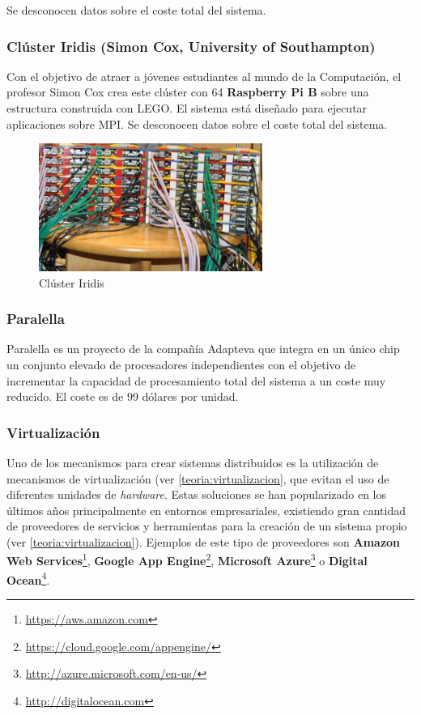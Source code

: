 Se desconocen datos sobre el coste total del sistema.

\subsubsection{Clúster Iridis (Simon Cox, University of Southampton)}

Con el objetivo de atraer a jóvenes estudiantes al mundo de la Computación, el profesor Simon Cox crea este clúster con 64 \textbf{Raspberry Pi B} sobre una estructura construida con LEGO\cite{cox:raspberry}. El sistema está diseñado para ejecutar aplicaciones sobre MPI. Se desconocen datos sobre el coste total del sistema.

\begin{figure}[H]
	\centering
	\includegraphics[width=0.65\textwidth]{Chapters/Chapter1/Figures/iridis-pi.jpg}
	\caption[Iridis]{Clúster Iridis}
	\label{cox:iridis}
\end{figure}

\subsubsection{Paralella}

Paralella es un proyecto de la compañía Adapteva que integra en un único chip un conjunto elevado de procesadores independientes con el objetivo de incrementar la capacidad de procesamiento total del sistema a un coste muy reducido\cite{paralella}. El coste es de 99 dólares por unidad.

\subsubsection{Virtualización}

Uno de los mecanismos para crear sistemas distribuidos es la utilización de mecanismos de virtualización (ver \ref{teoria:virtualizacion}, que evitan el uso de diferentes unidades de \textit{hardware}. Estas soluciones se han popularizado en los últimos años principalmente en entornos empresariales, existiendo gran cantidad de proveedores de servicios y herramientas para la creación de un sistema propio (ver \ref{teoria:virtualizacion}). Ejemplos de este tipo de proveedores son \textbf{Amazon Web Services}\footnote{\href{http://aws.amazon.com/}{https://aws.amazon.com}}, \textbf{Google App Engine}\footnote{\href{https://cloud.google.com/appengine/}{https://cloud.google.com/appengine/}}, \textbf{Microsoft Azure}\footnote{\href{http://azure.microsoft.com/}{http://azure.microsoft.com/en-us/}} o \textbf{Digital Ocean}\footnote{\href{http://digitalocean.com}{http://digitalocean.com}}.
